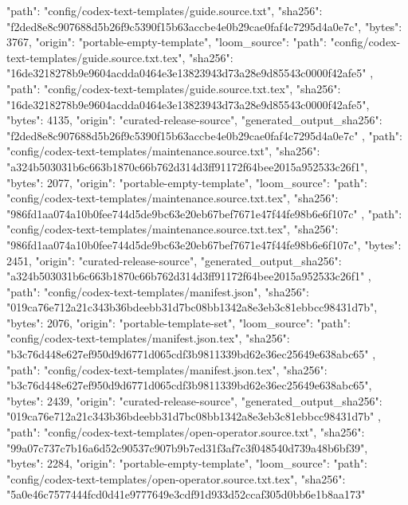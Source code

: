 {    {
      "path": "config/codex-text-templates/guide.source.txt",
      "sha256": "f2ded8e8c907688d5b26f9c5390f15b63accbe4e0b29cae0faf4c7295d4a0e7c",
      "bytes": 3767,
      "origin": "portable-empty-template",
      "loom_source": {
        "path": "config/codex-text-templates/guide.source.txt.tex",
        "sha256": "16de3218278b9e9604acdda0464e3e13823943d73a28e9d85543c0000f42afe5"
      }
    },
    {
      "path": "config/codex-text-templates/guide.source.txt.tex",
      "sha256": "16de3218278b9e9604acdda0464e3e13823943d73a28e9d85543c0000f42afe5",
      "bytes": 4135,
      "origin": "curated-release-source",
      "generated_output_sha256": "f2ded8e8c907688d5b26f9c5390f15b63accbe4e0b29cae0faf4c7295d4a0e7c"
    },
    {
      "path": "config/codex-text-templates/maintenance.source.txt",
      "sha256": "a324b503031b6c663b1870c66b762d314d3ff91172f64bee2015a952533c26f1",
      "bytes": 2077,
      "origin": "portable-empty-template",
      "loom_source": {
        "path": "config/codex-text-templates/maintenance.source.txt.tex",
        "sha256": "986fd1aa074a10b0fee744d5de9bc63e20eb67bef7671e47f44fe98b6e6f107c"
      }
    },
    {
      "path": "config/codex-text-templates/maintenance.source.txt.tex",
      "sha256": "986fd1aa074a10b0fee744d5de9bc63e20eb67bef7671e47f44fe98b6e6f107c",
      "bytes": 2451,
      "origin": "curated-release-source",
      "generated_output_sha256": "a324b503031b6c663b1870c66b762d314d3ff91172f64bee2015a952533c26f1"
    },
    {
      "path": "config/codex-text-templates/manifest.json",
      "sha256": "019ca76e712a21c343b36bdeebb31d7bc08bb1342a8e3eb3c81ebbcc98431d7b",
      "bytes": 2076,
      "origin": "portable-template-set",
      "loom_source": {
        "path": "config/codex-text-templates/manifest.json.tex",
        "sha256": "b3c76d448e627ef950d9d6771d065cdf3b9811339bd62e36ec25649e638abc65"
      }
    },
    {
      "path": "config/codex-text-templates/manifest.json.tex",
      "sha256": "b3c76d448e627ef950d9d6771d065cdf3b9811339bd62e36ec25649e638abc65",
      "bytes": 2439,
      "origin": "curated-release-source",
      "generated_output_sha256": "019ca76e712a21c343b36bdeebb31d7bc08bb1342a8e3eb3c81ebbcc98431d7b"
    },
    {
      "path": "config/codex-text-templates/open-operator.source.txt",
      "sha256": "99a07c737c7b16a6d52c90537c907b9b7ed31f3af7c3f048540d739a48b6bf39",
      "bytes": 2284,
      "origin": "portable-empty-template",
      "loom_source": {
        "path": "config/codex-text-templates/open-operator.source.txt.tex",
        "sha256": "5a0e46c7577444fcd0d41e9777649e3cdf91d933d52ccaf305d0bb6e1b8aa173"
}}}
